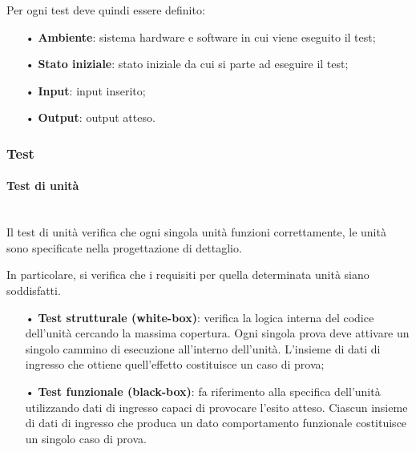 {Per ogni test deve quindi essere definito: 
\begin{itemize}
\item[•] \textbf{Ambiente}: sistema hardware e software in cui viene eseguito il test; 
\item[•]\textbf{Stato iniziale}: stato iniziale da cui si parte ad eseguire il test; 
\item[•] \textbf{Input}: input inserito;
\item[•] \textbf{Output}: output atteso.
\end{itemize}

\subsubsection{Test}

\paragraph{Test di unità}\mbox{}\\
Il test di unità verifica che ogni singola unità funzioni correttamente, le unità sono specificate nella progettazione di dettaglio.  

In particolare, si verifica che i requisiti per quella determinata unità siano soddisfatti.
\begin{itemize}
\item[•] \textbf{Test strutturale (white-box)}: verifica la logica interna del codice dell’unità cercando la massima copertura. Ogni singola prova deve attivare un singolo cammino di esecuzione all’interno dell’unità. L’insieme di dati di ingresso che ottiene quell’effetto costituisce un caso di prova;
\item[•] \textbf{Test funzionale (black-box)}: fa riferimento alla specifica dell'unità utilizzando dati di ingresso capaci di provocare l'esito atteso. Ciascun insieme di dati di ingresso che produca un dato comportamento funzionale costituisce un singolo caso di prova.
\end{itemize}

}

